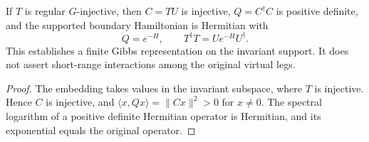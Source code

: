 \begin{lemma}%
    \label{thm:peps_regular_boundary_supported_gram_gibbs}
    \leanok
    If $T$ is regular $G$-injective, then $C=TU$ is injective,
    $Q=C^\dagger C$ is positive definite, and the supported
    boundary Hamiltonian is Hermitian with
    \[
        Q=e^{-H},\qquad T^\dagger T=Ue^{-H}U^\dagger.
    \]
    This establishes a finite Gibbs representation on the invariant
    support. It does not assert short-range interactions among
    the original virtual legs.
\end{lemma}

\begin{proof}\leanok
    The embedding takes values in the invariant subspace, where
    $T$ is injective. Hence $C$ is injective, and
    $\langle x,Qx\rangle=\|Cx\|^2>0$ for $x\ne0$.
    The spectral logarithm of a positive definite Hermitian
    operator is Hermitian, and its exponential equals the
    original operator.
\end{proof}
